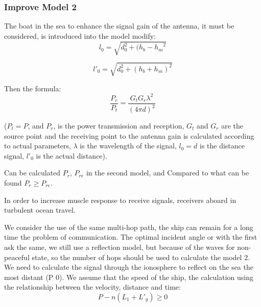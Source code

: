 \documentclass{mcmthesis}
\begin{document}
\subsubsection{Improve Model 2}
The boat in the sea to enhance the signal gain of the antenna, it must be considered, is introduced into the model modify:%
\begin{equation} \label{37}
{l_0} = \sqrt {d_0^2 + ({h_b} - {h_m}^2} 
\end{equation}

\begin{equation} \label{38}
l{'_0} = \sqrt {d_0^2 + {{({h_b} + {h_m})}^2}}
\end{equation}


Then the formula:
\begin{equation} \label{40}
\frac{{{P_r}}}{{{P_t}}} = \frac{{{G_t}{G_r}{\lambda ^2}}}{{{{(4\pi d)}^2}}}
\end{equation}

(${P_t} = P$, and ${P_r}$, is the power transmission and reception, $G_t$ and $G_r$ are the source point and the receiving point to the antenna gain is calculated according to actual parameters, $\lambda$ is the wavelength of the signal, ${l_0} = d$ is the distance signal, $l{'_0}$ is the actual distance).

Can be calculated $P_r$, $P_{re}$ in the second model, and Compared to what can be found ${P_r} \geqslant {P_{re}}$.

In order to increase muscle response to receive signals, receivers aboard in turbulent ocean travel.

We consider the use of the same multi-hop path, the ship can remain for a long time the problem of communication. The optimal incident angle or with the first ask the same, we still use a reflection model, but because of the waves for non-peaceful state, so the number of hops should be used to calculate the model 2. We need to calculate the signal through the ionosphere to reflect on the sea the most distant (P 0). We assume that the speed of the ship, the calculation using the relationship between the velocity, distance and time:
\begin{equation} \label{41}
P - n({L_1} + L{'_g}) \geqslant 0
\end{equation}
\end{document}
